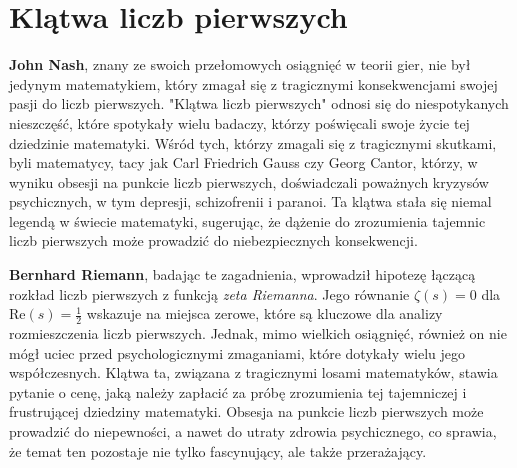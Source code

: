 \documentclass{article}
\begin{document}
\section{Klątwa liczb pierwszych}

\textbf{John Nash}, znany ze swoich przełomowych osiągnięć w teorii gier, nie był jedynym matematykiem, który zmagał się z tragicznymi konsekwencjami swojej pasji do liczb pierwszych. "Klątwa liczb pierwszych" odnosi się do niespotykanych nieszczęść, które spotykały wielu badaczy, którzy poświęcali swoje życie tej dziedzinie matematyki. Wśród tych, którzy zmagali się z tragicznymi skutkami, byli matematycy, tacy jak Carl Friedrich Gauss czy Georg Cantor, którzy, w wyniku obsesji na punkcie liczb pierwszych, doświadczali poważnych kryzysów psychicznych, w tym depresji, schizofrenii i paranoi. Ta klątwa stała się niemal legendą w świecie matematyki, sugerując, że dążenie do zrozumienia tajemnic liczb pierwszych może prowadzić do niebezpiecznych konsekwencji.

\textbf{Bernhard Riemann}, badając te zagadnienia, wprowadził hipotezę łączącą rozkład liczb pierwszych z funkcją \textit{zeta Riemanna}. Jego równanie \(\zeta(s) = 0\) dla \(\text{Re}(s) = \frac{1}{2}\) wskazuje na miejsca zerowe, które są kluczowe dla analizy rozmieszczenia liczb pierwszych. Jednak, mimo wielkich osiągnięć, również on nie mógł uciec przed psychologicznymi zmaganiami, które dotykały wielu jego współczesnych. Klątwa ta, związana z tragicznymi losami matematyków, stawia pytanie o cenę, jaką należy zapłacić za próbę zrozumienia tej tajemniczej i frustrującej dziedziny matematyki. Obsesja na punkcie liczb pierwszych może prowadzić do niepewności, a nawet do utraty zdrowia psychicznego, co sprawia, że temat ten pozostaje nie tylko fascynujący, ale także przerażający.
\end{document}
